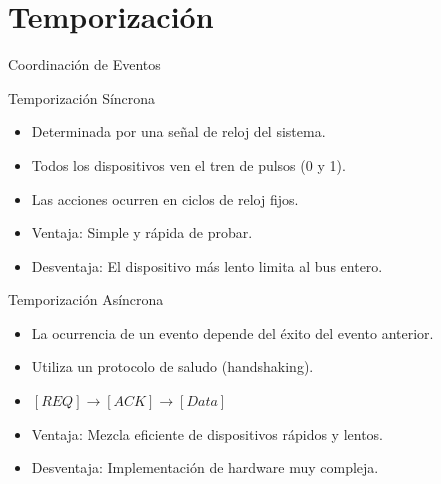 \documentclass[presentation]{beamer}
\begin{document}
\section{Temporización}
\label{sec:orge3b3cd1}
\begin{frame}[label={sec:org059932f}]{Coordinación de Eventos}
\begin{block}{Temporización Síncrona}
\begin{itemize}
\item Determinada por una señal de \alert{reloj del sistema}.
\item Todos los dispositivos ven el tren de pulsos (0 y 1).
\item Las acciones ocurren en ciclos de reloj fijos.
\item \alert{Ventaja}: Simple y rápida de probar.
\item \alert{Desventaja}: El dispositivo más lento limita al bus entero.
\end{itemize}
\end{block}

\begin{block}{Temporización Asíncrona}
\begin{itemize}
\item La ocurrencia de un evento depende del éxito del evento anterior.
\item Utiliza un protocolo de saludo (\alert{handshaking}).
\item \([REQ] \rightarrow [ACK] \rightarrow [Data]\)
\item \alert{Ventaja}: Mezcla eficiente de dispositivos rápidos y lentos.
\item \alert{Desventaja}: Implementación de hardware muy compleja.
\end{itemize}
\end{block}
\end{frame}
\end{document}
